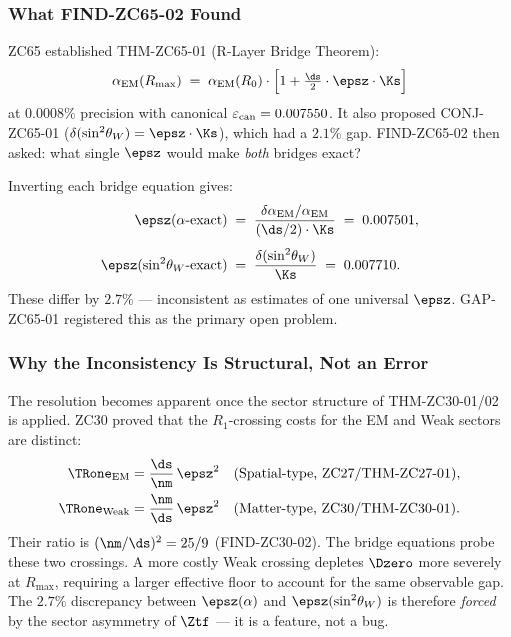 \documentclass[12pt, a4paper]{article}
\renewcommand{\epscan}{\varepsilon_{\rm can}}
\renewcommand{\swsq}{\sin^2\!\theta_W}
\renewcommand{\aEM}{\alpha_{\rm EM}}
\begin{document}
\subsubsection{What FIND-ZC65-02 Found}

ZC65 established THM-ZC65-01 (R-Layer Bridge Theorem):
\[
  \aEM(R_{\max}) \;=\; \aEM(R_0)\cdot\Bigl[1 + \tfrac{\ds}{2}\cdot\epsz\cdot\Ks\Bigr]
\]
at $0.0008\%$ precision with canonical $\epscan = 0.007550$.
It also proposed CONJ-ZC65-01 ($\delta(\swsq) = \epsz\cdot\Ks$),
which had a $2.1\%$ gap.
FIND-ZC65-02 then asked: what single $\epsz$ would make
\emph{both} bridges exact?

\begin{openqbox}[title={The Inconsistency from FIND-ZC65-02}]
Inverting each bridge equation gives:
\begin{align*}
  \epsz(\alpha\text{-exact})
  &\;=\;
  \frac{\delta\aEM/\aEM}{(\ds/2)\cdot\Ks}
  \;=\; 0.007501,\\[4pt]
  \epsz(\swsq\text{-exact})
  &\;=\;
  \frac{\delta(\swsq)}{\Ks}
  \;=\; 0.007710.
\end{align*}
These differ by $2.7\%$ --- inconsistent as estimates of one
universal $\epsz$.
GAP-ZC65-01 registered this as the primary open problem.
\end{openqbox}

\subsubsection{Why the Inconsistency Is Structural, Not an Error}

The resolution becomes apparent once the sector structure of
THM-ZC30-01/02 is applied.
ZC30 proved that the $R_1$-crossing costs for the EM and Weak
sectors are distinct:
\begin{align*}
  \TRone_{\rm EM}   &= \frac{\ds}{\nm}\,\epsz^{2}
  \quad\text{(Spatial-type, ZC27/THM-ZC27-01)},\\
  \TRone_{\rm Weak} &= \frac{\nm}{\ds}\,\epsz^{2}
  \quad\text{(Matter-type, ZC30/THM-ZC30-01)}.
\end{align*}
Their ratio is $(\nm/\ds)^{2} = 25/9$ (FIND-ZC30-02).
The bridge equations probe these two crossings.
A more costly Weak crossing depletes $\Dzero$ more severely
at $R_{\max}$, requiring a larger effective floor to account
for the same observable gap.
The $2.7\%$ discrepancy between $\epsz(\alpha)$ and $\epsz(\swsq)$
is therefore \emph{forced} by the sector asymmetry of $\Ztf$
--- it is a feature, not a bug.
\end{document}
